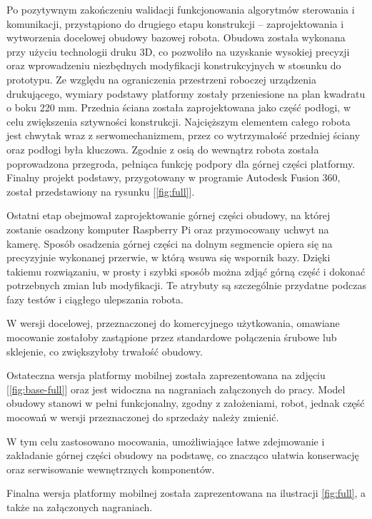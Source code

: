 Po pozytywnym zakończeniu walidacji funkcjonowania algorytmów sterowania i komunikacji, przystąpiono do drugiego etapu konstrukcji – zaprojektowania i wytworzenia docelowej obudowy bazowej robota. Obudowa została wykonana przy użyciu technologii druku 3D, co pozwoliło na uzyskanie wysokiej precyzji oraz wprowadzeniu niezbędnych modyfikacji konstrukcyjnych w stosunku do prototypu. Ze względu na ograniczenia przestrzeni roboczej urządzenia drukującego, wymiary podstawy platformy zostały przeniesione na plan kwadratu o boku 220 mm.
Przednia ściana została zaprojektowana jako część podłogi, w celu zwiększenia sztywności konstrukcji. Najcięższym elementem całego robota jest chwytak wraz z serwomechanizmem, przez co wytrzymałość przedniej ściany oraz podłogi była kluczowa. Zgodnie z osią do wewnątrz robota została poprowadzona przegroda, pełniąca funkcję podpory dla górnej części platformy.
Finalny projekt podstawy, przygotowany w programie Autodesk Fusion 360, został przedstawiony na rysunku [\ref{fig:full}].

\hspace{1cm} 

Ostatni etap obejmował zaprojektowanie górnej części obudowy, na której zostanie osadzony komputer Raspberry Pi oraz przymocowany uchwyt na kamerę. Sposób osadzenia górnej części na dolnym segmencie opiera się na precyzyjnie wykonanej przerwie, w którą wsuwa się wspornik bazy. Dzięki takiemu rozwiązaniu, w prosty i szybki sposób można zdjąć górną część i dokonać potrzebnych zmian lub modyfikacji. Te atrybuty są szczególnie przydatne podczas fazy testów i ciągłego ulepszania robota.

W wersji docelowej, przeznaczonej do komercyjnego użytkowania, omawiane mocowanie zostałoby zastąpione przez standardowe połączenia śrubowe lub sklejenie, co zwiększyłoby trwałość obudowy.

\hspace{1cm}

Ostateczna wersja platformy mobilnej została zaprezentowana na zdjęciu [\ref{fig:base-full}] oraz jest widoczna na nagraniach załączonych do pracy. Model obudowy stanowi w pełni funkcjonalny, zgodny z założeniami, robot, jednak część mocowań w wersji przeznaczonej do sprzedaży należy zmienić. 

W tym celu zastosowano mocowania, umożliwiające łatwe zdejmowanie i zakładanie górnej części obudowy na podstawę, co znacząco ułatwia konserwację oraz serwisowanie wewnętrznych komponentów.

Finalna wersja platformy mobilnej została zaprezentowana na ilustracji \ref{fig:full}, a także na załączonych nagraniach.


